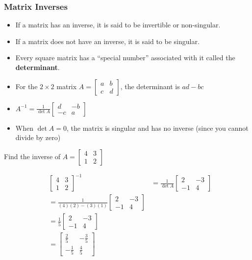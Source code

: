 \documentclass[
  letterpaper,
  DIV=11,
  numbers=noendperiod]{scrartcl}
\begin{document}
\subsubsection{Matrix Inverses}\label{matrix-inverses}

\begin{itemize}
\item
  If a matrix has an inverse, it is said to be invertible or
  non-singular.
\item
  If a matrix does not have an inverse, it is said to be singular.
\item
  Every square matrix has a ``special number'' associated with it called
  the \textbf{determinant}.
\item
  For the \(2 \times 2\) matrix
  \(A = \begin{bmatrix}a & b \\ c & d \end{bmatrix}\), the determinant
  is \(ad-bc\)
\item
  \(A^{-1} = \frac{1}{\det{A}}\begin{bmatrix}d & -b \\ -c & a \end{bmatrix}\)
\item
  When \(\det{A} = 0\), the matrix is singular and has no inverse (since
  you cannot divide by zero)
\end{itemize}

Find the inverse of \(A = \begin{bmatrix}4 & 3 \\ 1 & 2 \end{bmatrix}\)

\begin{align*}
&\begin{bmatrix}4 & 3 \\ 1 & 2 \end{bmatrix}^{-1} &= \frac{1}{\det{A}}\begin{bmatrix}2 & -3 \\ -1 & 4 \end{bmatrix} \\
&= \frac{1}{(4)(2)-(3)(1)}\begin{bmatrix}2 & -3 \\ -1 & 4 \end{bmatrix} \\
&= \frac{1}{5}\begin{bmatrix}2 & -3 \\ -1 & 4 \end{bmatrix} \\
&= \begin{bmatrix}\frac{2}{5} & -\frac{3}{5} \\ -\frac{1}{5} & \frac{4}{5} \end{bmatrix}
\end{align*}
\end{document}
